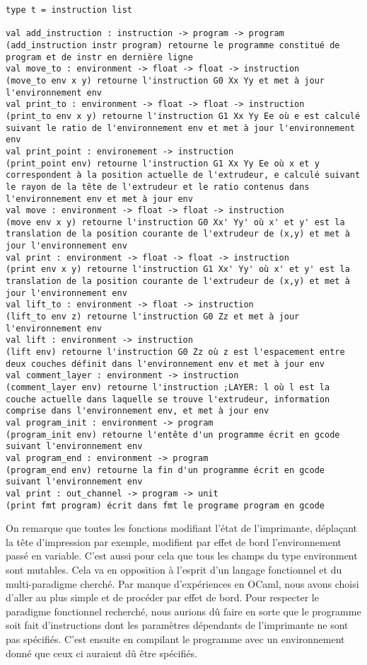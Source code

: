\documentclass[11pt, titlepage]{article}
\begin{document}
\begin{lstlisting}
type t = instruction list

val add_instruction : instruction -> program -> program
(add_instruction instr program) retourne le programme constitué de program et de instr en dernière ligne
val move_to : environment -> float -> float -> instruction
(move_to env x y) retourne l'instruction G0 Xx Yy et met à jour l'environnement env
val print_to : environment -> float -> float -> instruction  
(print_to env x y) retourne l'instruction G1 Xx Yy Ee où e est calculé suivant le ratio de l'environnement env et met à jour l'environnement env 
val print_point : environement -> instruction
(print_point env) retourne l'instruction G1 Xx Yy Ee où x et y correspondent à la position actuelle de l'extrudeur, e calculé suivant le rayon de la tête de l'extrudeur et le ratio contenus dans l'environnement env et met à jour env
val move : environment -> float -> float -> instruction
(move env x y) retourne l'instruction G0 Xx' Yy' où x' et y' est la translation de la position courante de l'extrudeur de (x,y) et met à jour l'environnement env
val print : environment -> float -> float -> instruction
(print env x y) retourne l'instruction G1 Xx' Yy' où x' et y' est la translation de la position courante de l'extrudeur de (x,y) et met à jour l'environnement env
val lift_to : environment -> float -> instruction
(lift_to env z) retourne l'instruction G0 Zz et met à jour l'environnement env
val lift : environment -> instruction
(lift env) retourne l'instruction G0 Zz où z est l'espacement entre deux couches définit dans l'environnement env et met à jour env
val comment_layer : environment -> instruction
(comment_layer env) retourne l'instruction ;LAYER: l où l est la couche actuelle dans laquelle se trouve l'extrudeur, information comprise dans l'environnement env, et met à jour env
val program_init : environment -> program
(program_init env) retourne l'entête d'un programme écrit en gcode suivant l'environnement env
val program_end : environment -> program
(program_end env) retourne la fin d'un programme écrit en gcode suivant l'environnement env
val print : out_channel -> program -> unit
(print fmt program) écrit dans fmt le programe program en gcode
\end{lstlisting}

On remarque que toutes les fonctions modifiant l'état de l'imprimante, déplaçant la tête d'impression par exemple, modifient par effet de bord l'environnement passé en variable. C'est aussi pour cela que tous les champs du type environment sont mutables. Cela va en opposition à l'esprit d'un langage fonctionnel et du multi-paradigme cherché. Par manque d'expériences en OCaml, nous avons choisi d'aller au plus simple et de procéder par effet de bord. Pour respecter le paradigme fonctionnel recherché, nous aurions dû faire en sorte que le programme soit fait d'instructions dont les paramètres dépendants de l'imprimante ne sont pas spécifiés. C'est ensuite en compilant le programme avec un environnement donné que ceux ci auraient dû être spécifiés.
\end{document}
